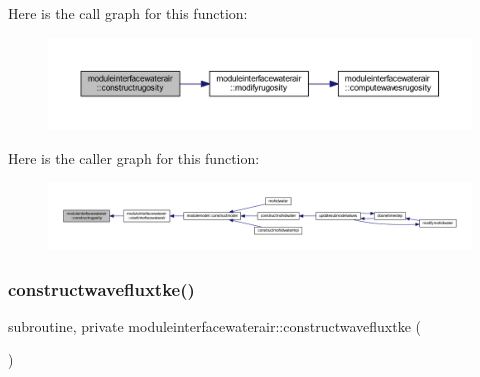 Here is the call graph for this function\+:\nopagebreak
\begin{figure}[H]
\begin{center}
\leavevmode
\includegraphics[width=350pt]{namespacemoduleinterfacewaterair_ae5a4815896d07094361faa53fb69aa03_cgraph}
\end{center}
\end{figure}
Here is the caller graph for this function\+:\nopagebreak
\begin{figure}[H]
\begin{center}
\leavevmode
\includegraphics[width=350pt]{namespacemoduleinterfacewaterair_ae5a4815896d07094361faa53fb69aa03_icgraph}
\end{center}
\end{figure}
\mbox{\label{namespacemoduleinterfacewaterair_af474bb755901d845cb8a0f3efa8ffcbe}} 
\subsubsection{\texorpdfstring{constructwavefluxtke()}{constructwavefluxtke()}}
{\footnotesize\ttfamily subroutine, private moduleinterfacewaterair\+::constructwavefluxtke (\begin{DoxyParamCaption}{ }\end{DoxyParamCaption})\hspace{0.3cm}{\ttfamily [private]}}

